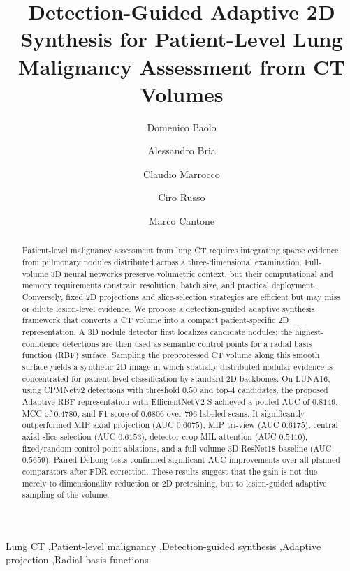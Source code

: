 \documentclass[preprint,12pt]{elsarticle}
\begin{document}
\begin{frontmatter}

\title{Detection-Guided Adaptive 2D Synthesis for Patient-Level Lung Malignancy Assessment from CT Volumes}

\author[1]{Domenico Paolo}
\author[1]{Alessandro Bria}
\author[1]{Claudio Marrocco}
\author[1]{Ciro Russo}
\author[1]{Marco Cantone}



\begin{abstract}
Patient-level malignancy assessment from lung CT requires integrating sparse evidence from pulmonary nodules distributed across a three-dimensional examination. Full-volume 3D neural networks preserve volumetric context, but their computational and memory requirements constrain resolution, batch size, and practical deployment. Conversely, fixed 2D projections and slice-selection strategies are efficient but may miss or dilute lesion-level evidence. We propose a detection-guided adaptive synthesis framework that converts a CT volume into a compact patient-specific 2D representation. A 3D nodule detector first localizes candidate nodules; the highest-confidence detections are then used as semantic control points for a radial basis function (RBF) surface. Sampling the preprocessed CT volume along this smooth surface yields a synthetic 2D image in which spatially distributed nodular evidence is concentrated for patient-level classification by standard 2D backbones. On LUNA16, using CPMNetv2 detections with threshold $0.50$ and top-$4$ candidates, the proposed Adaptive RBF representation with EfficientNetV2-S achieved a pooled AUC of $0.8149$, MCC of $0.4780$, and F1 score of $0.6806$ over 796 labeled scans. It significantly outperformed MIP axial projection (AUC $0.6075$), MIP tri-view (AUC $0.6175$), central axial slice selection (AUC $0.6153$), detector-crop MIL attention (AUC $0.5410$), fixed/random control-point ablations, and a full-volume 3D ResNet18 baseline (AUC $0.5659$). Paired DeLong tests confirmed significant AUC improvements over all planned comparators after FDR correction. These results suggest that the gain is not due merely to dimensionality reduction or 2D pretraining, but to lesion-guided adaptive sampling of the volume.
\end{abstract}

\begin{keyword}
Lung CT \sep Patient-level malignancy \sep Detection-guided synthesis \sep Adaptive projection \sep Radial basis functions
\end{keyword}

\end{frontmatter}
\end{document}
